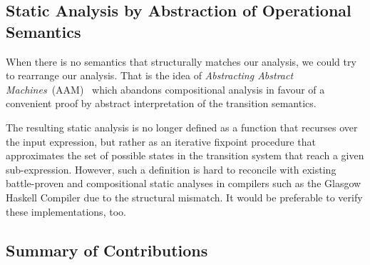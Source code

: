 \subsection{Static Analysis by Abstraction of Operational Semantics}

When there is no semantics that structurally matches our analysis, we could
try to rearrange our analysis.
That is the idea of \emph{Abstracting Abstract Machines}~(AAM)~\citep{aam} which
abandons compositional analysis in favour of a convenient proof by abstract
interpretation of the transition semantics.

The resulting static analysis is no longer defined as a function that recurses
over the input expression, but rather as an iterative fixpoint procedure that
approximates the set of possible states in the transition system that reach a
given sub-expression.
However, such a definition is hard to reconcile with existing battle-proven and
compositional static analyses in compilers such as the Glasgow Haskell Compiler
due to the structural mismatch.
It would be preferable to verify these implementations, too.


\subsection{Summary of Contributions}

